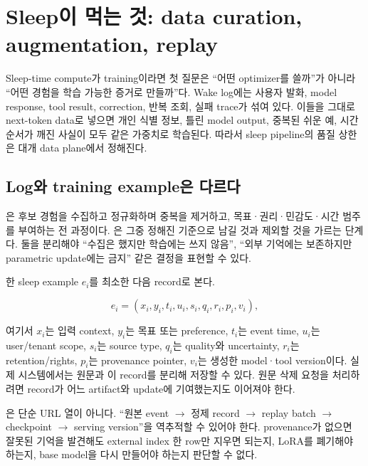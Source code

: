 \chapter{Sleep이 먹는 것: data curation, augmentation, replay}
\label{bg:chapter-data-replay}

Sleep-time compute가 training이라면 첫 질문은 ``어떤 optimizer를 쓸까''가 아니라
``어떤 경험을 학습 가능한 증거로 만들까''다. Wake log에는 사용자 발화, model response,
tool result, correction, 반복 조회, 실패 trace가 섞여 있다. 이들을 그대로 next-token data로
넣으면 개인 식별 정보, 틀린 model output, 중복된 쉬운 예, 시간 순서가 깨진 사실이 모두 같은
가중치로 학습된다. 따라서 sleep pipeline의 품질 상한은 대개 data plane에서 정해진다.

\section{Log와 training example은 다르다}

은 후보 경험을 수집하고 정규화하며 중복을 제거하고,
목표·권리·민감도·시간 범주를 부여하는 전 과정이다. 은
그중 정해진 기준으로 남길 것과 제외할 것을 가르는 단계다. 둘을 분리해야 ``수집은 했지만
학습에는 쓰지 않음'', ``외부 기억에는 보존하지만 parametric update에는 금지'' 같은 결정을
표현할 수 있다.

한 sleep example $e_i$를 최소한 다음 record로 본다.

\begin{equation}
e_i=(x_i, y_i, t_i, u_i, s_i, q_i, r_i, p_i, v_i),
\end{equation}

여기서 $x_i$는 입력 context, $y_i$는 목표 또는 preference, $t_i$는 event time, $u_i$는
user/tenant scope, $s_i$는 source type, $q_i$는 quality와 uncertainty, $r_i$는 retention/rights,
$p_i$는 provenance pointer, $v_i$는 생성한 model·tool version이다. 실제 시스템에서는 원문과
이 record를 분리해 저장할 수 있다. 원문 삭제 요청을 처리하려면 record가 어느 artifact와
update에 기여했는지도 이어져야 한다.

은 단순 URL 열이 아니다. ``원본 event $\rightarrow$
정제 record $\rightarrow$ replay batch $\rightarrow$ checkpoint $\rightarrow$ serving version''을
역추적할 수 있어야 한다. provenance가 없으면 잘못된 기억을 발견해도 external index 한 row만
지우면 되는지, LoRA를 폐기해야 하는지, base model을 다시 만들어야 하는지 판단할 수 없다.

